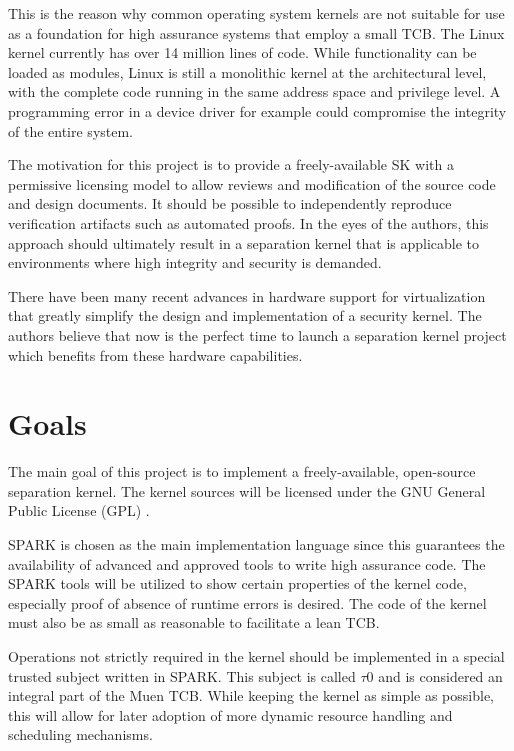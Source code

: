 This is the reason why common operating system kernels are not suitable for use
as a foundation for high assurance systems that employ a small TCB. The
Linux kernel currently has over 14 million lines of code. While
functionality can be loaded as modules, Linux is still a
monolithic kernel at the architectural level, with the
complete code running in the same address space and privilege level. A
programming error in a device driver for example could compromise the integrity
of the entire system.

The motivation for this project is to provide a freely-available SK with a
permissive licensing model to allow reviews and modification of
the source code and design documents. It should be possible to independently
reproduce verification artifacts such as automated proofs. In the eyes of the
authors, this approach should ultimately result in a separation kernel that is
applicable to environments where high integrity and security is demanded.

There have been many recent advances in hardware support for virtualization
that greatly simplify the design and implementation of a security kernel. The
authors believe that now is the perfect time to launch a separation kernel
project which benefits from these hardware capabilities.

\section{Goals}
The main goal of this project is to implement a freely-available, open-source
separation kernel. The kernel sources will be licensed under the GNU General
Public License (GPL) \cite{gpl}.

SPARK is chosen as the main implementation language since this guarantees the
availability of advanced and approved tools to write high assurance code. The
SPARK tools will be utilized to show certain properties of the kernel code,
especially proof of absence of runtime errors is desired. The code of the kernel
must also be as small as reasonable to facilitate a lean TCB.

Operations not strictly required in the kernel should be implemented in a
special trusted subject written in SPARK. This subject is called $\tau$0 and is
considered an integral part of the Muen TCB. While keeping the kernel as simple
as possible, this will allow for later adoption of more dynamic resource
handling and scheduling mechanisms.

